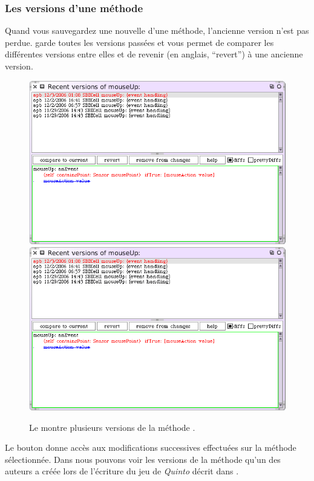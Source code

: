 \documentclass[a4paper,10pt,twoside]{book}
\begin{document}
\subsubsection{Les versions d'une m\'ethode}
\label{sec:versions}

Quand vous sauvegardez une nouvelle  d'une m\'ethode,
l'ancienne version n'est pas perdue. \sq garde toutes les versions pass\'ees et vous permet de comparer les diff\'erentes versions entre elles et de revenir (en anglais, ``revert'') \`a une ancienne version.
\begin{figure}[btp]
   \centering
   \ifluluelse
	   {\includegraphics[width=\textwidth]{VersionsOfMouseUp} }
	   {\includegraphics[scale=0.7]{VersionsOfMouseUp} }
   \caption{Le  montre plusieurs versions de la m\'ethode .}
   \label{fig:mouseUpVersions}
\end{figure}
Le bouton  donne acc\`es aux modifications successives
effectu\'ees sur la m\'ethode s\'electionn\'ee.
Dans  nous pouvons voir les versions de la m\'ethode  qu'un des auteurs a cr\'e\'ee lors de l'\'ecriture du jeu de \emph{Quinto} d\'ecrit dans .
\end{document}
